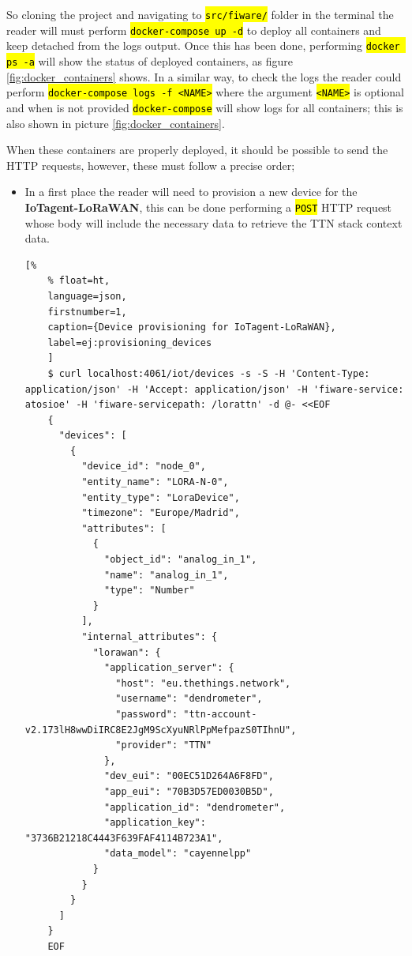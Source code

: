 \documentclass[11pt,a4paper,dvipsnames,twoside]{article}
\newcommand{\cmd}[1] {\hl{\texttt{#1}}}
\begin{document}
So cloning the project and navigating to \cmd{src/fiware/} folder in the terminal the reader will must perform \cmd{docker-compose up -d} to deploy all containers and keep detached from the logs output. Once this has been done, performing \cmd{docker ps -a} will show the status of deployed containers, as figure \ref{fig:docker_containers} shows. In a similar way, to check the logs the reader could perform \cmd{docker-compose logs -f <NAME>} where the argument \cmd{<NAME>} is optional and when is not provided \cmd{docker-compose} will show logs for all containers; this is also shown in picture \ref{fig:docker_containers}.

When these containers are properly deployed, it should be possible to send the HTTP requests, however, these must follow a precise order; 


\begin{itemize}
  \item In a first place the reader will need to provision a new device for the \textbf{IoTagent-LoRaWAN}, this can be done performing a \cmd{POST} HTTP request whose body will include the necessary data to retrieve the TTN stack context data.
  
  \begin{lstlisting}[%
    % float=ht,
    language=json,
    firstnumber=1,
    caption={Device provisioning for IoTagent-LoRaWAN},
    label=ej:provisioning_devices
    ]
    $ curl localhost:4061/iot/devices -s -S -H 'Content-Type: application/json' -H 'Accept: application/json' -H 'fiware-service: atosioe' -H 'fiware-servicepath: /lorattn' -d @- <<EOF
    {
      "devices": [
        {
          "device_id": "node_0",
          "entity_name": "LORA-N-0",
          "entity_type": "LoraDevice",
          "timezone": "Europe/Madrid",
          "attributes": [
            {
              "object_id": "analog_in_1",
              "name": "analog_in_1",
              "type": "Number"
            }
          ],
          "internal_attributes": {
            "lorawan": {
              "application_server": {
                "host": "eu.thethings.network",
                "username": "dendrometer",
                "password": "ttn-account-v2.173lH8wwDiIRC8E2JgM9ScXyuNRlPpMefpazS0TIhnU",
                "provider": "TTN"
              },
              "dev_eui": "00EC51D264A6F8FD",
              "app_eui": "70B3D57ED0030B5D",
              "application_id": "dendrometer",
              "application_key": "3736B21218C4443F639FAF4114B723A1",
              "data_model": "cayennelpp"
            }
          }
        }
      ]
    }
    EOF
  \end{lstlisting}


\end{itemize}
\end{document}
